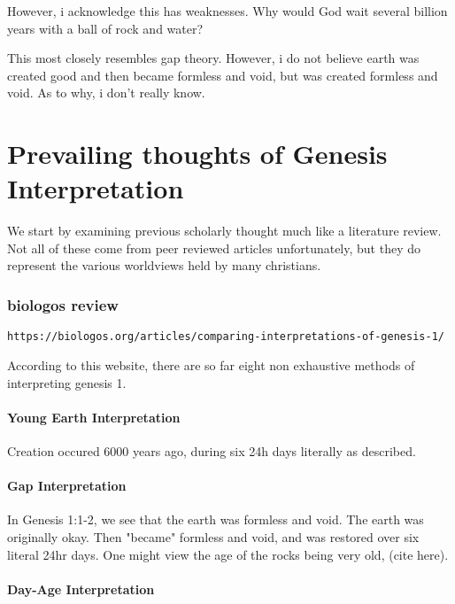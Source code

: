 \documentclass[11]{article}
\begin{document}
However, i acknowledge this has weaknesses. Why would God wait several billion years with a ball of rock and water? 

This most closely resembles gap theory. However, i do not believe earth was created good and then became formless and void, but was created formless and void. As to why, i don't really know. 

\part{Prevailing thoughts of Genesis Interpretation}

We start by examining previous scholarly thought much like a literature review. Not all of these come from peer reviewed articles unfortunately, but they do represent the various worldviews held by many christians.

\section{biologos review}

\begin{verbatim}
https://biologos.org/articles/comparing-interpretations-of-genesis-1/
\end{verbatim}

According to this website, there are so far eight non exhaustive methods of interpreting genesis 1.

\subsection{Young Earth Interpretation}

Creation occured 6000 years ago, during six 24h days literally as described. 

\subsection{Gap Interpretation}

In Genesis 1:1-2, we see that the earth was formless and void. The earth was originally okay. Then "became" formless and void, and was restored over six literal 24hr days. One might view the age of the rocks being very old, (cite here). 

\subsection{Day-Age Interpretation}
\end{document}

